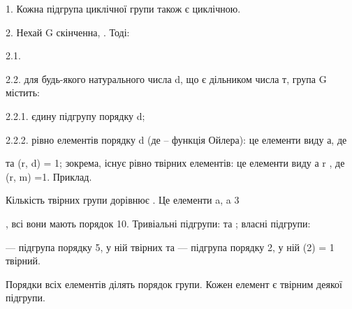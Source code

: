 1. Кожна підгрупа циклічної групи також є циклічною.

2. Нехай G скінченна,  . Тоді:

2.1.

2.2. для будь-якого натурального числа d, що є дільником числа
т, група G містить:

2.2.1. єдину підгрупу порядку d;

2.2.2. рівно  елементів порядку d (де  – функція
Ойлера): це елементи виду а, де

та (r, d) = 1; зокрема, існує
рівно  твірних елементів: це елементи виду а
r
, де (r, m) =1.
Приклад.

Кількість твірних групи дорівнює . Це елементи a,
a
3

, всі вони мають порядок 10.
Тривіальні підгрупи: та ;
власні підгрупи:

--- підгрупа порядку 5, у ній
 твірних та --- підгрупа порядку 2, у ній (2) = 1
твірний.

Порядки всіх елементів ділять порядок групи. Кожен елемент є
твірним деякої підгрупи.



